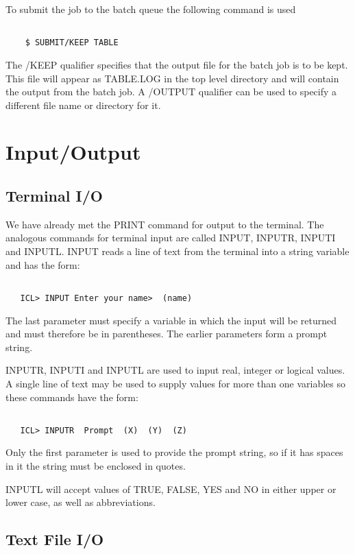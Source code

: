 \documentclass[twoside,11pt]{report}
\newcommand{\xlabel}[1]{}
\begin{document}
To submit the job to the batch queue the following command is used
\begin{verbatim}

    $ SUBMIT/KEEP TABLE

\end{verbatim}
The /KEEP qualifier specifies that the output file for the batch job is
to be kept. This file will appear as TABLE.LOG in the top level directory
and will contain the output from the batch job. A /OUTPUT qualifier
can be used to specify a different file name or directory for it.

\chapter{\xlabel{inputoutput}Input/Output}

\section{\xlabel{terminal_io}Terminal I/O}

We have already met the PRINT command for output to the terminal. The analogous
commands for terminal input are called INPUT, INPUTR, INPUTI and INPUTL.
INPUT reads a line of text from the terminal into a string variable and
has the form:
\begin{verbatim}

   ICL> INPUT Enter your name>  (name)

\end{verbatim}
The last parameter must specify a variable in which the input will be returned
and must therefore be in parentheses. The earlier parameters form a prompt
string.

INPUTR, INPUTI and INPUTL are used to input real, integer or logical values.
A single line of text may be used to supply values for more than one variables
so these commands have the form:
\begin{verbatim}

   ICL> INPUTR  Prompt  (X)  (Y)  (Z)

\end{verbatim}
Only the first parameter is used to provide the prompt string, so if it
has spaces in it the string must be enclosed in quotes.

INPUTL will accept values of TRUE, FALSE, YES and NO in either upper or
lower case, as well as abbreviations.

\section{\xlabel{text_file_io}Text File I/O}
\end{document}
